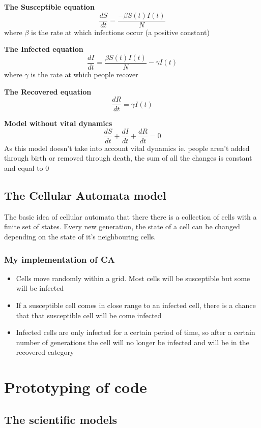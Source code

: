 \documentclass[11pt, a4paper]{article}
\begin{document}
\textbf{The Susceptible equation}
\[ \frac{dS}{dt}=\frac{-\beta S(t)I(t)}{N} \]
where \(\beta\) is the rate at which infections occur (a positive constant)


\textbf{The Infected equation}
\[ \frac{dI}{dt}=\frac{\beta S(t)I(t)}{N}-\gamma I(t) \]
where \(\gamma\) is the rate at which people recover


\textbf{The Recovered equation}
\[ \frac{dR}{dt}=\gamma I(t) \]


\textbf{Model without vital dynamics}
\[ \frac{dS}{dt} + \frac{dI}{dt} + \frac{dR}{dt} = 0 \]
As this model doesn't take into account vital dynamics ie. people aren't added through birth or removed through death, the sum of all the changes is constant and equal to 0


\subsection{The Cellular Automata model}
The basic idea of cellular automata that there there is a collection of cells with a finite set of states. Every new generation, the state of a cell can be changed depending on the state of it's neighbouring cells. 

\subsubsection{My implementation of CA}
\begin{itemize}
    \item Cells move randomly within a grid. Most cells will be susceptible but some will be infected
    \item If a susceptible cell comes in close range to an infected cell, there is a chance that that susceptible cell will be come infected
    \item Infected cells are only infected for a certain period of time, so after a certain number of generations the cell will no longer be infected and will be in the recovered category
\end{itemize}
\newpage
\section{Prototyping of code}

\subsection{The scientific models}
\end{document}
